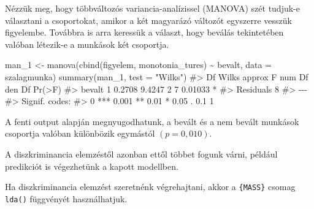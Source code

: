 \documentclass[
  letterpaper,
]{krantz}
\makeatletter
\newenvironment{Shaded}{\begin{snugshade}}{\end{snugshade}}
\newcommand{\AttributeTok}[1]{\textcolor[rgb]{0.40,0.45,0.13}{#1}}
\newcommand{\CommentTok}[1]{\textcolor[rgb]{0.37,0.37,0.37}{#1}}
\newcommand{\FunctionTok}[1]{\textcolor[rgb]{0.28,0.35,0.67}{#1}}
\newcommand{\NormalTok}[1]{\textcolor[rgb]{0.00,0.23,0.31}{#1}}
\newcommand{\OtherTok}[1]{\textcolor[rgb]{0.00,0.23,0.31}{#1}}
\newcommand{\SpecialCharTok}[1]{\textcolor[rgb]{0.37,0.37,0.37}{#1}}
\newcommand{\StringTok}[1]{\textcolor[rgb]{0.13,0.47,0.30}{#1}}
\newenvironment{kframe}{%
\medskip{}
\setlength{\fboxsep}{.8em}
 \def\at@end@of@kframe{}%
 \ifinner\ifhmode%
  \def\at@end@of@kframe{\end{minipage}}%
  \begin{minipage}{\columnwidth}%
 \fi\fi%
 \def\FrameCommand##1{\hskip\@totalleftmargin \hskip-\fboxsep
 \colorbox{shadecolor}{##1}\hskip-\fboxsep
     \hskip-\linewidth \hskip-\@totalleftmargin \hskip\columnwidth}%
 \MakeFramed {\advance\hsize-\width
   \@totalleftmargin\z@ \linewidth\hsize
   \@setminipage}}%
 {\par\unskip\endMakeFramed%
 \at@end@of@kframe}
\renewenvironment{Shaded}{\begin{kframe}}{\end{kframe}}
\makeatother
\begin{document}
Nézzük meg, hogy többváltozós variancia-analízissel (MANOVA) szét
tudjuk-e választani a csoportokat, amikor a két magyarázó változót
egyszerre vesszük figyelembe. Továbbra is arra keressük a választ, hogy
beválás tekintetében valóban létezik-e a munkások két csoportja.

\begin{Shaded}
\begin{Highlighting}[]
\NormalTok{man\_1 }\OtherTok{\textless{}{-}} \FunctionTok{manova}\NormalTok{(}\FunctionTok{cbind}\NormalTok{(figyelem, monotonia\_tures) }\SpecialCharTok{\textasciitilde{}}\NormalTok{ bevalt, }\AttributeTok{data =}\NormalTok{ szalagmunka)}
\FunctionTok{summary}\NormalTok{(man\_1, }\AttributeTok{test =} \StringTok{"Wilks"}\NormalTok{)}
\CommentTok{\#\textgreater{}           Df  Wilks approx F num Df den Df  Pr(\textgreater{}F)  }
\CommentTok{\#\textgreater{} bevalt     1 0.2708   9.4247      2      7 0.01033 *}
\CommentTok{\#\textgreater{} Residuals  8                                        }
\CommentTok{\#\textgreater{} {-}{-}{-}}
\CommentTok{\#\textgreater{} Signif. codes:  }
\CommentTok{\#\textgreater{} 0 \textquotesingle{}***\textquotesingle{} 0.001 \textquotesingle{}**\textquotesingle{} 0.01 \textquotesingle{}*\textquotesingle{} 0.05 \textquotesingle{}.\textquotesingle{} 0.1 \textquotesingle{} \textquotesingle{} 1}
\end{Highlighting}
\end{Shaded}

A fenti output alapján megnyugodhatunk, a bevált és a nem bevált
munkások csoportja valóban különbözik egymástól \((p=0,010)\).

A diszkriminancia elemzéstől azonban ettől többet fogunk várni, például
predikciót is végezhetünk a kapott modellben.

Ha diszkriminancia elemzést szeretnénk végrehajtani, akkor a
\texttt{\{MASS\}} csomag \texttt{lda()} függvényét használhatjuk.
\end{document}
